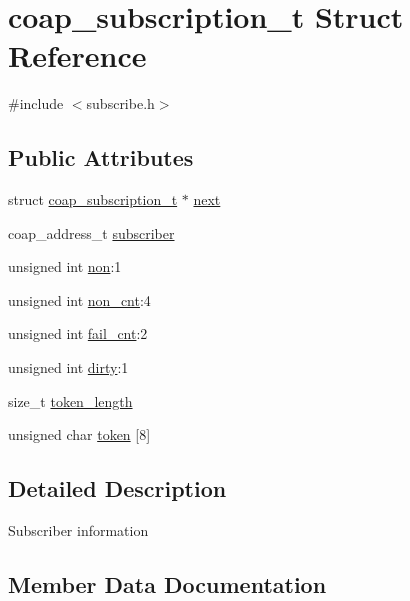 \hypertarget{structcoap__subscription__t}{}\section{coap\+\_\+subscription\+\_\+t Struct Reference}
\label{structcoap__subscription__t}


{\ttfamily \#include $<$subscribe.\+h$>$}

\subsection*{Public Attributes}
\begin{DoxyCompactItemize}
\item 
struct \hyperlink{structcoap__subscription__t}{coap\+\_\+subscription\+\_\+t} $\ast$ \hyperlink{structcoap__subscription__t_aa751cbb82d18f3d8285ef5dcaa577d47}{next}
\item 
coap\+\_\+address\+\_\+t \hyperlink{structcoap__subscription__t_aee4d3dad6a6721ecd018c19bb1bf6c92}{subscriber}
\item 
unsigned int \hyperlink{structcoap__subscription__t_a50940aab24e1d5514a1d67f0e5341c86}{non}\+:1
\item 
unsigned int \hyperlink{structcoap__subscription__t_a8c83fc8034daa9f5c88b943698eeb466}{non\+\_\+cnt}\+:4
\item 
unsigned int \hyperlink{structcoap__subscription__t_a83676881b25552592d3cb34e6d98431a}{fail\+\_\+cnt}\+:2
\item 
unsigned int \hyperlink{structcoap__subscription__t_aa330d1abe6d6690e0d1e7af528a02133}{dirty}\+:1
\item 
size\+\_\+t \hyperlink{structcoap__subscription__t_a91ab09d2d6b7ac8d2cc19fcaa64a45c1}{token\+\_\+length}
\item 
unsigned char \hyperlink{structcoap__subscription__t_a2945242d243578ad07362355b3e68c2d}{token} \mbox{[}8\mbox{]}
\end{DoxyCompactItemize}


\subsection{Detailed Description}
Subscriber information 

\subsection{Member Data Documentation}
\hypertarget{structcoap__subscription__t_aa330d1abe6d6690e0d1e7af528a02133}{}
